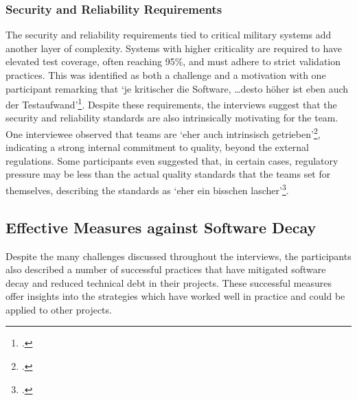 \subsubsection{Security and Reliability Requirements}
The security and reliability requirements tied to critical military systems add another layer of complexity. Systems with higher criticality are required to have elevated test coverage, often reaching 95\%, and must adhere to strict validation practices. This was identified as both a challenge and a motivation
with one participant remarking that `je kritischer die Software, \ldots desto höher ist eben auch der Testaufwand'\footcite[74]{Interview22025}.
Despite these requirements, the interviews suggest that the security and reliability standards are also intrinsically motivating for the team. One interviewee observed that teams are `eher auch intrinsisch getrieben'\footcite[84]{Interview32025}, indicating a strong internal commitment to quality, beyond the external regulations. 
Some participants even suggested that, in certain cases, regulatory pressure may be less than the actual quality standards that the teams set for themselves, describing the standards as `eher ein bisschen lascher'\footcite[84]{Interview32025}.

\subsection{Effective Measures against Software Decay}
Despite the many challenges discussed throughout the interviews, the participants also described a number of successful practices that have mitigated software decay and reduced technical debt in their projects. These successful measures offer insights into the strategies which have worked well in practice and could be applied to other projects.

